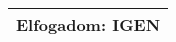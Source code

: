 \documentclass[10pt,a4paper]{article}
\begin{document}
\begin{figure}[!ht]
\begin{tabular}{|m{\textwidth}|}
    \hline \vspace{3pt}
    \textbf{Elfogadom:} \hspace{0.5cm} IGEN \vspace{3pt} \\
    \hline 
    \end{tabular} 
\end{figure}

\newpage
\end{document}
